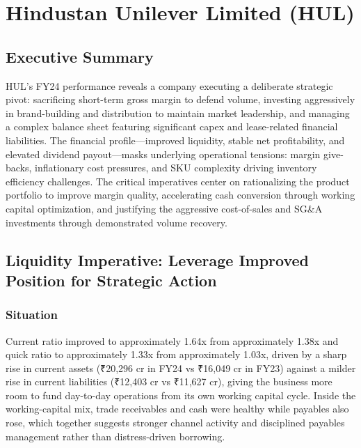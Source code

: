 \documentclass[12pt, a4paper]{report}
\begin{document}
\newpage

\section{Hindustan Unilever Limited (HUL)}

\subsection{Executive Summary}

HUL's FY24 performance reveals a company executing a deliberate strategic pivot: sacrificing short-term gross margin to defend volume, investing aggressively in brand-building and distribution to maintain market leadership, and managing a complex balance sheet featuring significant capex and lease-related financial liabilities. The financial profile—improved liquidity, stable net profitability, and elevated dividend payout—masks underlying operational tensions: margin give-backs, inflationary cost pressures, and SKU complexity driving inventory efficiency challenges. The critical imperatives center on rationalizing the product portfolio to improve margin quality, accelerating cash conversion through working capital optimization, and justifying the aggressive cost-of-sales and SG\&A investments through demonstrated volume recovery.

\subsection{Liquidity Imperative: Leverage Improved Position for Strategic Action}

\subsubsection{Situation}
Current ratio improved to approximately 1.64x from approximately 1.38x and quick ratio to approximately 1.33x from approximately 1.03x, driven by a sharp rise in current assets (₹20,296 cr in FY24 vs ₹16,049 cr in FY23) against a milder rise in current liabilities (₹12,403 cr vs ₹11,627 cr), giving the business more room to fund day-to-day operations from its own working capital cycle. Inside the working-capital mix, trade receivables and cash were healthy while payables also rose, which together suggests stronger channel activity and disciplined payables management rather than distress-driven borrowing.
\end{document}
